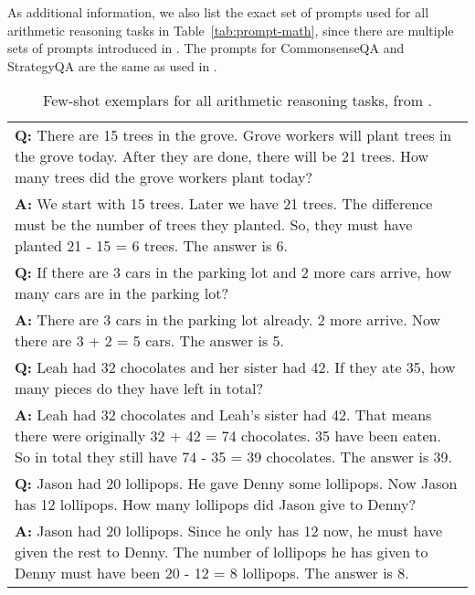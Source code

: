 As additional information, we also list the exact set of prompts used for all arithmetic reasoning tasks in Table~\ref{tab:prompt-math}, since there are multiple sets of prompts introduced in \cite{wei2022chain}. 
The prompts for CommonsenseQA and StrategyQA are the same as used in \cite{wei2022chain}.
\begin{table*}
    \caption{
    Few-shot exemplars for all arithmetic reasoning tasks, from \cite{wei2022chain}.
    }
    \centering
    \small
    \begin{tabular}{p{13.5cm}}
        \toprule
        \textbf{Q:} There are 15 trees in the grove. Grove workers will plant trees in the grove today. After they are done, there will be 21 trees. How many trees did the grove workers plant today? \\
        \vspace{-1mm}
        \textbf{A:} We start with 15 trees. Later we have 21 trees. The difference must be the number of trees they planted. So, they must have planted 21 - 15 = 6 trees. The answer is 6. \\
        \vspace{0mm}
        \textbf{Q:} If there are 3 cars in the parking lot and 2 more cars arrive, how many cars are in the parking lot? \\
        \vspace{-1mm}
        \textbf{A:} There are 3 cars in the parking lot already. 2 more arrive. Now there are 3 + 2 = 5 cars. The answer is 5. \\
        \vspace{0mm}
        \textbf{Q:} Leah had 32 chocolates and her sister had 42. If they ate 35, how many pieces do they have left in total? \\
        \vspace{-1mm}
        \textbf{A:} Leah had 32 chocolates and Leah's sister had 42. That means there were originally 32 + 42 = 74 chocolates. 35 have been eaten. So in total they still have 74 - 35 = 39 chocolates. The answer is 39. \\
        \vspace{0mm}
        \textbf{Q:} Jason had 20 lollipops. He gave Denny some lollipops. Now Jason has 12 lollipops. How many lollipops did Jason give to Denny? \\
        \vspace{-1mm}
        \textbf{A:} Jason had 20 lollipops. Since he only has 12 now, he must have given the rest to Denny. The number of lollipops he has given to Denny must have been 20 - 12 = 8 lollipops. The answer is 8. \\

\end{tabular}
\end{table*}
